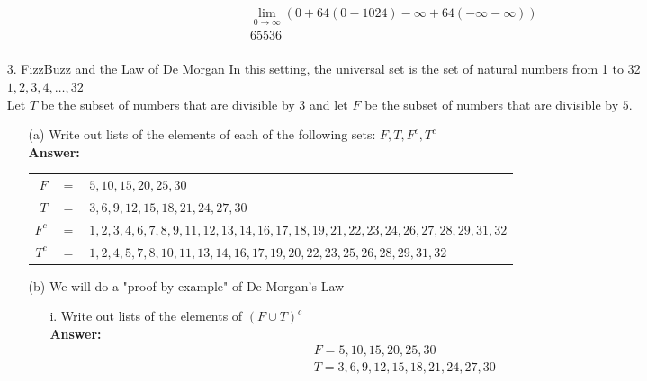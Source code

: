 \documentclass[a4paper]{article}
\begin{document}
\begin{itemize}
\begin{itemize}
\begin{equation}
\begin{split}
	      	      		\lim_{0\to\infty} (0 + 64(0 - 1024) - \infty + 64(-\infty - \infty)) \\
	      	      		65536 \\
	      	      	\end{split}
	      	      \end{equation}
	      \end{itemize}  
	\item[3.] FizzBuzz and the Law of De Morgan In this setting, the universal set is the set of natural numbers from 1 to 32 \\
	      ${1, 2, 3, 4, \ldots, 32}$ \\
	      Let $T$ be the subset of numbers that are divisible by $3$ and let $F$ be the subset of numbers that are divisible by $5$.
	      \begin{itemize}
	      	\item[(a)] Write out lists of the elements of each of the following sets: $F, T, F^{c}, T^{c}$ \\
	      	      \textbf{Answer:} 
	      	      \begin{tabular}{rcl}
	      	      	$F$     & $=$ & ${5, 10, 15, 20, 25, 30}$                                                                          \\
	      	      	$T$     & $=$ & ${3, 6, 9, 12, 15, 18, 21, 24, 27, 30}$                                                            \\
	      	      	$F^{c}$ & $=$ & ${1, 2, 3, 4, 6, 7, 8, 9, 11, 12, 13, 14, 16, 17, 18, 19, 21, 22, 23, 24, 26, 27, 28, 29, 31, 32}$ \\
	      	      	$T^{c}$ & $=$ & ${1, 2, 4, 5, 7, 8, 10, 11, 13, 14, 16, 17, 19, 20, 22, 23, 25, 26, 28, 29, 31, 32}$               \\
	      	      \end{tabular}
	      	\item[(b)] We will do a "proof by example" of De Morgan's Law
	      	      \begin{itemize}
	      	      	\item[i.] Write out lists of the elements of $(F \cup T)^{c}$ \\
	      	      	      \textbf{Answer:}
	      	      	      \begin{equation}
	      	      	      	\begin{split}
	      	      	      		F = {5, 10, 15, 20, 25, 30} \\
	      	      	      		T = {3, 6, 9, 12, 15, 18, 21, 24, 27, 30} \\

\end{split}
\end{equation}
\end{itemize}
\end{itemize}
\end{itemize}
\end{document}
